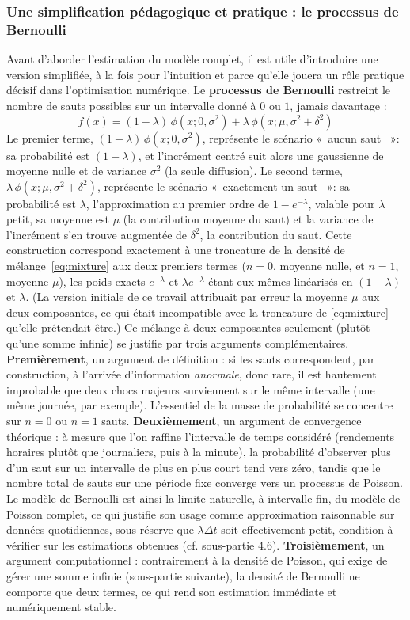 \documentclass{article}
\providecommand{\og}{«~}
\providecommand{\fg}{~»}
\begin{document}
\subsubsection*{Une simplification pédagogique et pratique : le processus de Bernoulli}
Avant d'aborder l'estimation du modèle complet, il est utile d'introduire une version simplifiée, à la fois pour l'intuition et parce qu'elle jouera un rôle pratique décisif dans l'optimisation numérique. Le \textbf{processus de Bernoulli} restreint le nombre de sauts possibles sur un intervalle donné à $0$ ou $1$, jamais davantage :
\begin{equation}
f(x) = (1-\lambda)\,\phi(x;0,\sigma^2) + \lambda\,\phi(x;\mu,\sigma^2+\delta^2)
\end{equation}
Le premier terme, $(1-\lambda)\,\phi(x;0,\sigma^2)$, représente le scénario \og aucun saut \fg : sa probabilité est $(1-\lambda)$, et l'incrément centré suit alors une gaussienne de moyenne nulle et de variance $\sigma^2$ (la seule diffusion). Le second terme, $\lambda\,\phi(x;\mu,\sigma^2+\delta^2)$, représente le scénario \og exactement un saut \fg : sa probabilité est $\lambda$, l'approximation au premier ordre de $1-e^{-\lambda}$, valable pour $\lambda$ petit, sa moyenne est $\mu$ (la contribution moyenne du saut) et la variance de l'incrément s'en trouve augmentée de $\delta^2$, la contribution du saut. Cette construction correspond exactement à une troncature de la densité de mélange~\eqref{eq:mixture} aux deux premiers termes ($n=0$, moyenne nulle, et $n=1$, moyenne $\mu$), les poids exacts $e^{-\lambda}$ et $\lambda e^{-\lambda}$ étant eux-mêmes linéarisés en $(1-\lambda)$ et $\lambda$. (La version initiale de ce travail attribuait par erreur la moyenne $\mu$ aux deux composantes, ce qui était incompatible avec la troncature de \eqref{eq:mixture} qu'elle prétendait être.)
Ce mélange à deux composantes seulement (plutôt qu'une somme infinie) se justifie par trois arguments complémentaires.
\textbf{Premièrement}, un argument de définition : si les sauts correspondent, par construction, à l'arrivée d'information \emph{anormale}, donc rare, il est hautement improbable que deux chocs majeurs surviennent sur le même intervalle (une même journée, par exemple). L'essentiel de la masse de probabilité se concentre sur $n=0$ ou $n=1$ sauts.
\textbf{Deuxièmement}, un argument de convergence théorique : à mesure que l'on raffine l'intervalle de temps considéré (rendements horaires plutôt que journaliers, puis à la minute), la probabilité d'observer plus d'un saut sur un intervalle de plus en plus court tend vers zéro, tandis que le nombre total de sauts sur une période fixe converge vers un processus de Poisson. Le modèle de Bernoulli est ainsi la limite naturelle, à intervalle fin, du modèle de Poisson complet, ce qui justifie son usage comme approximation raisonnable sur données quotidiennes, sous réserve que $\lambda\Delta t$ soit effectivement petit, condition à vérifier sur les estimations obtenues (cf. sous-partie 4.6).
\textbf{Troisièmement}, un argument computationnel : contrairement à la densité de Poisson, qui exige de gérer une somme infinie (sous-partie suivante), la densité de Bernoulli ne comporte que deux termes, ce qui rend son estimation immédiate et numériquement stable.
\end{document}
